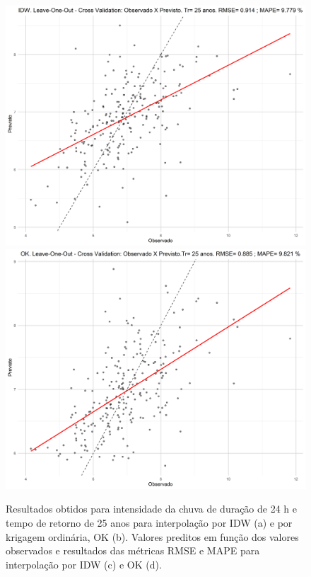 \documentclass[
]{agujournal2019}
\begin{document}
\begin{figure}
\begin{minipage}{\linewidth}
{}


\end{minipage}%
\newline
\begin{minipage}{\linewidth}
\includegraphics{Figuras/Figura12c.png}
\includegraphics{Figuras/Figura12d.png}\end{minipage}%

\caption{\label{fig-Figura12}Resultados obtidos para intensidade da
chuva de duração de 24 h e tempo de retorno de 25 anos para interpolação
por IDW (a) e por krigagem ordinária, OK (b). Valores preditos em função
dos valores observados e resultados das métricas RMSE e MAPE para
interpolação por IDW (c) e OK (d).}

\end{figure}%
\end{document}
